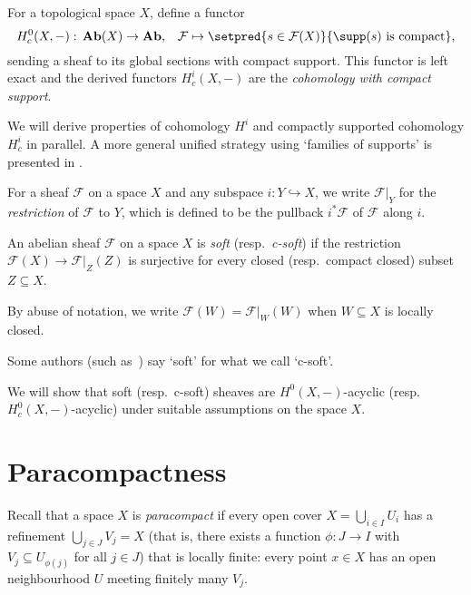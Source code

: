\begin{defn}
For a topological space \(X\), define a functor
\[ H^0_c(X,-)\colon\catAbelianSheaf(X)\to\catAbelianGroup\text{,}\quad\mathcal F\mapsto\setpred{s\in\mathcal F(X)}{\supp(s)\text{ is compact}}\text{,} \]
sending a sheaf to its global sections with compact support.
This functor is left exact and the derived functors \(H^i_c(X,-)\) are the \emph{cohomology with compact support}.
\end{defn}

We will derive properties of cohomology \(H^i\) and compactly supported cohomology \(H^i_c\) in parallel.
A more general unified strategy using `families of supports' is presented in \cite[\S~\RN{2}.9]{BredonSheafTheory}.

For a sheaf \(\mathcal F\) on a space \(X\) and any subspace \(i\colon Y\hookrightarrow X\), we write \(\mathcal F|_Y\) for the \emph{restriction} of \(\mathcal F\) to \(Y\), which is defined to be the pullback \(i^*\mathcal F\) of \(\mathcal F\) along \(i\).

\begin{defn}
An abelian sheaf \(\mathcal F\) on a space \(X\) is \emph{soft} (resp.~\emph{c-soft}) if the restriction \(\mathcal F(X)\to\mathcal F|_Z(Z)\) is surjective for every closed (resp.~compact closed) subset \(Z\subseteq X\).
\end{defn}

By abuse of notation, we write \(\mathcal F(W)=\mathcal F|_W(W)\) when \(W\subseteq X\) is locally closed.

\begin{rmk}
Some authors (such as~\cite{IversenCohomologyOfSheaves}) say `soft' for what we call `c-soft'.
\end{rmk}

We will show that soft (resp.~c-soft) sheaves are \(H^0(X,-)\)-acyclic (resp.~\(H^0_c(X,-)\)-acyclic) under suitable assumptions on the space \(X\).

\section{Paracompactness}
\noindent
Recall that a space \(X\) is \emph{paracompact} if every open cover \(X=\bigcup_{i\in I}U_i\) has a refinement \(\bigcup_{j\in J}V_j=X\) (that is, there exists a function \(\phi\colon J\to I\) with \(V_j\subseteq U_{\phi(j)}\) for all \(j\in J\)) that is locally finite: every point \(x\in X\) has an open neighbourhood \(U\) meeting finitely many \(V_j\).

